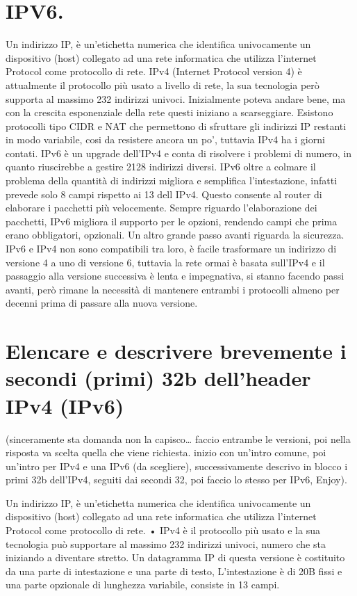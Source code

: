  
\section{IPV6.}

Un indirizzo IP, è un’etichetta numerica che identifica univocamente un dispositivo (host) collegato ad una rete informatica che utilizza l’internet Protocol come protocollo di rete.
IPv4 (Internet Protocol version 4) è attualmente il protocollo più usato a livello di rete, la sua tecnologia però supporta al massimo 232 indirizzi univoci.
Inizialmente poteva andare bene, ma con la crescita esponenziale della rete questi iniziano a scarseggiare. Esistono protocolli tipo CIDR e NAT che permettono di sfruttare gli indirizzi IP restanti in modo variabile, cosi da resistere ancora un po’, tuttavia IPv4 ha i giorni contati.
IPv6 è un upgrade dell’IPv4 e conta di risolvere i problemi di numero, in quanto riuscirebbe a gestire 2128 indirizzi diversi.
IPv6 oltre a colmare il problema della quantità di indirizzi migliora e semplifica l’intestazione, infatti prevede solo 8 campi rispetto ai 13 dell IPv4. Questo consente al router di elaborare i pacchetti più velocemente. Sempre riguardo l’elaborazione dei pacchetti, IPv6 migliora il supporto per le opzioni, rendendo campi che prima erano obbligatori, opzionali. Un altro grande passo avanti riguarda la sicurezza.
IPv6 e IPv4 non sono compatibili tra loro, è facile trasformare un indirizzo di versione 4 a uno di versione 6, tuttavia la rete ormai è basata sull’IPv4 e il passaggio alla versione successiva è lenta e impegnativa, si stanno facendo passi avanti, però rimane la necessità di mantenere entrambi i protocolli almeno per decenni prima di passare alla nuova versione.

\section{Elencare e descrivere brevemente i secondi (primi) 32b dell'header IPv4 (IPv6)}
(sinceramente sta domanda non la capisco… faccio entrambe le versioni, poi nella risposta va scelta quella che viene richiesta. inizio con un’intro comune, poi un’intro per IPv4 e una IPv6 (da scegliere), successivamente descrivo in blocco i primi 32b dell’IPv4, seguiti dai secondi 32, poi faccio lo stesso per IPv6, Enjoy).

Un indirizzo IP, è un’etichetta numerica che identifica univocamente un dispositivo (host) collegato ad una rete informatica che utilizza l’internet Protocol come protocollo di rete.
•	IPv4 è il protocollo più usato e la sua tecnologia può supportare al massimo 232 indirizzi univoci, numero che sta iniziando a diventare stretto.
Un datagramma IP di questa versione è costituito da una parte di intestazione e una parte di testo, L’intestazione è di 20B fissi e una parte opzionale di lunghezza variabile, consiste in 13 campi.

